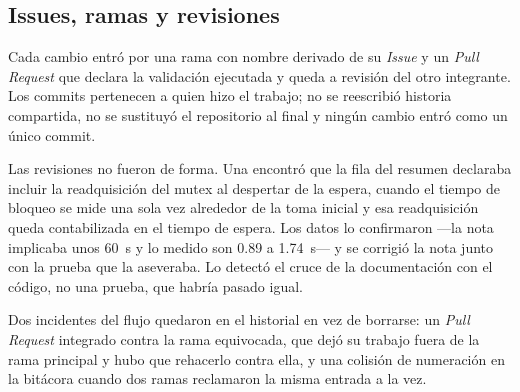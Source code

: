 \subsection{Issues, ramas y revisiones}

Cada cambio entró por una rama con nombre derivado de su \emph{Issue} y un
\emph{Pull Request} que declara la validación ejecutada y queda a revisión
del otro integrante. Los commits pertenecen a quien hizo el trabajo; no se
reescribió historia compartida, no se sustituyó el repositorio al final y
ningún cambio entró como un único commit.

Las revisiones no fueron de forma. Una encontró que la fila
 del resumen declaraba incluir la readquisición del
mutex al despertar de la espera, cuando el tiempo de bloqueo se mide una
sola vez alrededor de la toma inicial y esa readquisición queda
contabilizada en el tiempo de espera. Los datos lo confirmaron ---la nota
implicaba unos 60~\textmu s y lo medido son 0.89 a 1.74~\textmu s--- y se
corrigió la nota junto con la prueba que la aseveraba. Lo detectó el cruce
de la documentación con el código, no una prueba, que habría pasado igual.

Dos incidentes del flujo quedaron en el historial en vez de borrarse: un
\emph{Pull Request} integrado contra la rama equivocada, que dejó su trabajo
fuera de la rama principal y hubo que rehacerlo contra ella, y una colisión
de numeración en la bitácora cuando dos ramas reclamaron la misma entrada a
la vez.
